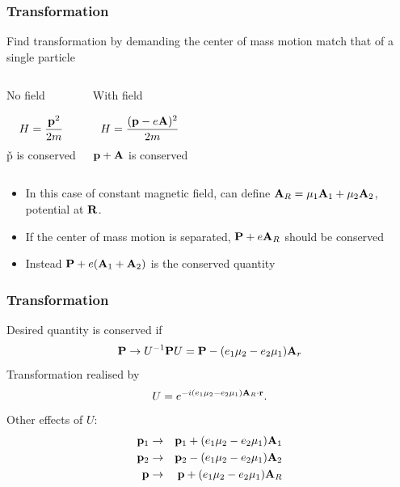 \documentclass[11ppt]{beamer}
\newcommand{\beqa}{\begin{eqnarray*} }
\newcommand{\eeqa}{\end{eqnarray*} }
\newcommand{\beq}{\begin{equation*} }
\newcommand{\eeq}{\end{equation*} }
\begin{document}
\begin{frame}
\frametitle{Transformation}
	Find transformation by demanding the center of mass motion match that of a single particle
	\begin{columns}[t]
	\column{2in} 
		\begin{block}{No field}\begin{center}
		\beq H = \frac{\v{p}^2}{2m}\eeq
		\v{p} is conserved
		\end{center} \end{block}
	
	\column{2in} 
	\begin{block}{With field}	\begin{center}	
		\beq H = \frac{ (\v{p}-e\v{A})^2}{2m} \eeq
		$\mathbf{p} + \mathbf{A}$ is conserved \end{center}
		\end{block}
	\end{columns}
	\small
	\begin{itemize}
		\item In this case of constant magnetic field, can define $\mathbf{A}_R = \mu_1 \mathbf{A}_1 + \mu_2 \mathbf{A}_2$, potential at $\mathbf{R}$.
		\item If the center of mass motion is separated, $\mathbf{P} + e\mathbf{A}_R$ should be conserved
		\item Instead $\mathbf{P} + e(\mathbf{A}_1 + \mathbf{A}_2)$ is the conserved quantity
	\end{itemize}
	\normalsize
\end{frame}

\begin{frame}
\frametitle{Transformation}

Desired quantity is conserved if 
\beq
	\v{P} \to U^{-1} \v{P} U = \v{P} - (e_1 \mu_2 - e_2 \mu_1)\v{A}_r
\eeq
Transformation realised by
\beq
	U = e^{-i(e_1\mu_2 - e_2 \mu_1) \v{A}_R \cdot \v{r}}.
\eeq
Other effects of $U$:
\beqa
	\v{p}_1 &\to& \v{p}_1 + (e_1 \mu_2 - e_2 \mu_1) \v{A}_1		\\
	\v{p}_2 &\to&  \v{p}_2 - (e_1 \mu_2 - e_2 \mu_1) \v{A}_2	\\			
	\v{p} &\to& \v{p} + (e_1 \mu_2 - e_2 \mu_1) \v{A}_R
\eeqa

\end{frame}
\end{document}
